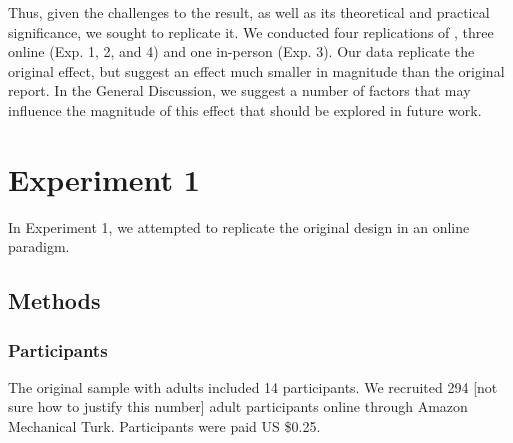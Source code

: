 \documentclass[man]{apa2}
\begin{document}
Thus, given the challenges to the  result, as well as its theoretical and practical significance, we sought to replicate it.  We conducted four replications of , three online (Exp. 1, 2, and 4) and one in-person (Exp. 3).  Our data replicate the original effect, but suggest an effect much smaller in magnitude than the original report. In the General Discussion, we suggest a number of factors that may influence the magnitude of this effect that should be explored in future work.








  
\section{Experiment 1} 
In Experiment 1, we attempted to replicate the original design in an online paradigm. 

\subsection{Methods}
\subsubsection{Participants} 
The original sample with adults included 14 participants. We recruited 294 [not sure how to justify this number] adult participants online through Amazon Mechanical Turk. Participants were paid US \$0.25. 
\end{document}
